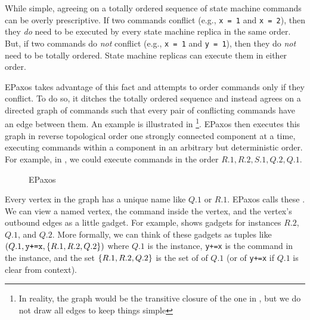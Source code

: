 \documentclass{mwhittaker}
\theoremstyle{definition}
\begin{document}
While simple, agreeing on a totally ordered sequence of state machine commands
can be overly prescriptive. If two commands conflict (e.g., \texttt{x = 1} and
\texttt{x = 2}), then they \emph{do} need to be executed by every state machine
replica in the same order. But, if two commands do \emph{not} conflict (e.g.,
\texttt{x = 1} and \texttt{y = 1}), then they do \emph{not} need to be totally
ordered.  State machine replicas can execute them in either order.

EPaxos takes advantage of this fact and attempts to order commands only if they
conflict. To do so, it ditches the totally ordered sequence and instead agrees
on a directed graph of commands such that every pair of conflicting commands
have an edge between them. An example is illustrated in %
\footnote{%
  In reality, the graph would be the transitive closure of the one in
  , but we do not draw all edges to keep things simple
}.
EPaxos then executes this graph in reverse topological order one strongly
connected component at a time, executing commands within a component in an
arbitrary but deterministic order. For example, in , we
could execute commands in the order $R.1, R.2, S.1, Q.2, Q.1$.

\begin{figure}[h]
  \centering
  \caption{EPaxos}
\end{figure}

Every vertex in the graph has a unique name like $Q.1$ or $R.1$. EPaxos calls
these . We can view a named vertex, the command inside the
vertex, and the vertex's outbound edges as a little gadget. For example,
 shows gadgets for instances $R.2$, $Q.1$, and $Q.2$.
%
More formally, we can think of these gadgets as tuples like $(Q.1,
\texttt{y+=x}, \{R.1, R.2, Q.2\})$ where $Q.1$ is the instance, \texttt{y+=x}
is the command in the instance, and the set $\{R.1, R.2, Q.2\}$ is the set of
 of $Q.1$ (or of \texttt{y+=x} if $Q.1$ is clear from
context).
\end{document}
